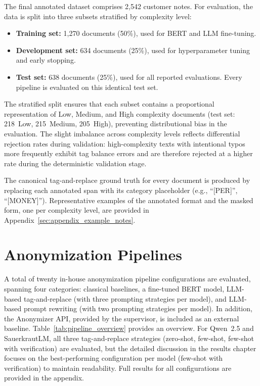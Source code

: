 The final annotated dataset comprises 2{,}542 customer notes. For evaluation,
the data is split into three subsets stratified by complexity level:

\begin{itemize}
    \item \textbf{Training set:} 1{,}270 documents (50\%), used for BERT and
    LLM fine-tuning.
    \item \textbf{Development set:} 634 documents (25\%), used for
    hyperparameter tuning and early stopping.
    \item \textbf{Test set:} 638 documents (25\%), used for all reported
    evaluations. Every pipeline is evaluated on this identical test set.
\end{itemize}

The stratified split ensures that each subset contains a proportional
representation of Low, Medium, and High complexity documents (test set:
218~Low, 215~Medium, 205~High), preventing distributional bias in the
evaluation. The slight imbalance across complexity levels reflects
differential rejection rates during validation: high-complexity texts with
intentional typos more frequently exhibit tag balance errors and are
therefore rejected at a higher rate during the deterministic validation
stage.


The canonical tag-and-replace ground truth for every document is produced
by replacing each annotated span with its category placeholder (e.g.,
``[PER]'', ``[MONEY]''). Representative examples of the annotated format
and the masked form, one per complexity level, are provided in
Appendix~\ref{sec:appendix_example_notes}.


\section{Anonymization Pipelines}
\label{sec:anonymization_pipelines}

A total of twenty in-house anonymization pipeline configurations are
evaluated, spanning four categories: classical baselines, a fine-tuned
BERT model, LLM-based tag-and-replace (with three prompting strategies
per model), and LLM-based prompt rewriting (with two prompting strategies
per model). In addition, the Anonymizer API, provided by the supervisor,
is included as an external baseline.
Table~\ref{tab:pipeline_overview} provides an overview. For Qwen~2.5 and SauerkrautLM, all three tag-and-replace strategies
(zero-shot, few-shot, few-shot with verification) are evaluated, but the
detailed discussion in the results chapter focuses on the best-performing
configuration per model (few-shot with verification) to maintain readability.
Full results for all configurations are provided in the appendix.

